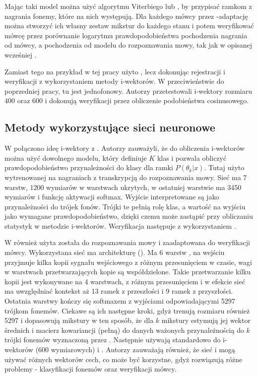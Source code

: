 Mając taki model można użyć algorytmu Viterbiego lub , by przypisać ramkom z nagrania
fonemy, które na nich występują. Dla każdego mówcy
przez -adaptację można stworzyć ich własny zestaw mikstur do każdego stanu i potem weryfikować
mówcę przez porównanie logarytmu prawdopodobieństwa
pochodzenia nagrania od mówcy, a pochodzenia od modelu do rozpoznawania mowy, tak jak
w opisanej wcześniej .

Zamiast tego na przykład w tej pracy \cite{iVectorHmmBased}
użyto , lecz dokonując rejestracji i weryfikacji z wykorzystaniem metody i-wektorów.
W przeciwieństwie do poprzedniej pracy, tu  jest jednofonowy. Autorzy przetestowali
i-wektory rozmiaru 400 oraz 600 i dokonują weryfikacji przez obliczenie podobieństwa cosinusowego.

\subsection{Metody wykorzystujące sieci neuronowe}

W \cite{aNovelSchemeFor}
połączono ideę i-wektory z . Autorzy zauważyli, że do obliczenia i-wektorów można użyć dowolnego modelu, który definiuje $K$ klas i pozwala obliczyć prawdopodobieństwo
przynależności do klasy dla ramki $P(\theta_k | x)$.
Tutaj użyto  wytrenowanej na nagraniach z transkrypcją do rozpoznawania mowy. Sieć ma 7 warstw, 1200 wymiarów w warstwach ukrytych, w ostatniej warstwie ma 3450 wymiarów i funkcję aktywacji softmax.
Wyjście interpretowane są jako przynależności do trójek fonów. Trójki te pełnią rolę klas, a wartość na wyjściu jako wymagane prawdopodobieństwo, dzięki czemu  może zastąpić 
przy obliczaniu statystyk w metodzie i-wektorów. Weryfikacja następuje z wykorzystaniem .

W \cite{timeDelayDeep}
również użyta została  do rozpoznawania mowy i zaadaptowana do weryfikacji mówcy.
Wykorzystana sieć ma architekturę  (). Ma 6 warstw ,
na wejściu przyjmuje kilka kopii sygnału wejściowego z różnym przesunięciem w czasie, wagi
w warstwach przetwarzających kopie są współdzielone. Takie przetwarzanie kilku kopii jest wykonywane na
4 warstwach, z różnym przesunięciem i w efekcie sieć ma uwzględniać kontekst aż 13 ramek
z przeszłości i 9 ramek z przyszłości. Ostatnia warstwy kończy się softmaxem z wyjściami odpowiadającymi 5297 trójkom fonemów.
Ciekawe są ich następne kroki, gdyż trenują  rozmiaru również 5297
i dopasowują mikstury w ten sposób, że dla $k$ mikstury estymują jej wektor średnich i macierz kowariancji (pełną)
do danych ważonych przynależnością do $k$ trójki fonemów wyznaczoną przez .
Następnie używają  standardowo do i-wektorów (600 wymiarowych) i .
Autorzy zauważają również, że sieć i  mogą używać różnych wektorów cech,
co może być korzystne, gdyż rozwiązują różne problemy - klasyfikacji fonemów oraz weryfikacji mówcy.

